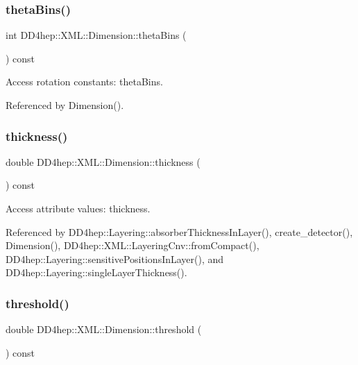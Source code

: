 \subsubsection{\texorpdfstring{theta\+Bins()}{thetaBins()}}
{\footnotesize\ttfamily int D\+D4hep\+::\+X\+M\+L\+::\+Dimension\+::theta\+Bins (\begin{DoxyParamCaption}{ }\end{DoxyParamCaption}) const}



Access rotation constants\+: theta\+Bins. 



Referenced by Dimension().

\hypertarget{struct_d_d4hep_1_1_x_m_l_1_1_dimension_a37a9d75490b44b904af4f7218186905f}{}\label{struct_d_d4hep_1_1_x_m_l_1_1_dimension_a37a9d75490b44b904af4f7218186905f} 
\subsubsection{\texorpdfstring{thickness()}{thickness()}}
{\footnotesize\ttfamily double D\+D4hep\+::\+X\+M\+L\+::\+Dimension\+::thickness (\begin{DoxyParamCaption}{ }\end{DoxyParamCaption}) const}



Access attribute values\+: thickness. 



Referenced by D\+D4hep\+::\+Layering\+::absorber\+Thickness\+In\+Layer(), create\+\_\+detector(), Dimension(), D\+D4hep\+::\+X\+M\+L\+::\+Layering\+Cnv\+::from\+Compact(), D\+D4hep\+::\+Layering\+::sensitive\+Positions\+In\+Layer(), and D\+D4hep\+::\+Layering\+::single\+Layer\+Thickness().

\hypertarget{struct_d_d4hep_1_1_x_m_l_1_1_dimension_aad2e7e171293d51825bb758dc80da6bc}{}\label{struct_d_d4hep_1_1_x_m_l_1_1_dimension_aad2e7e171293d51825bb758dc80da6bc} 
\subsubsection{\texorpdfstring{threshold()}{threshold()}\hspace{0.1cm}{\footnotesize\ttfamily [1/2]}}
{\footnotesize\ttfamily double D\+D4hep\+::\+X\+M\+L\+::\+Dimension\+::threshold (\begin{DoxyParamCaption}{ }\end{DoxyParamCaption}) const}



